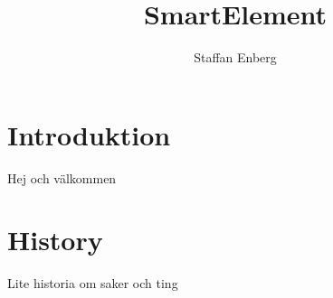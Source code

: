 \documentclass[10pt,a4paper]{article}
\author{Staffan Enberg}
\title{SmartElement}
\begin{document}
\section{Introduktion}
Hej och välkommen
\section{History}
Lite historia om saker och ting
\end{document}
